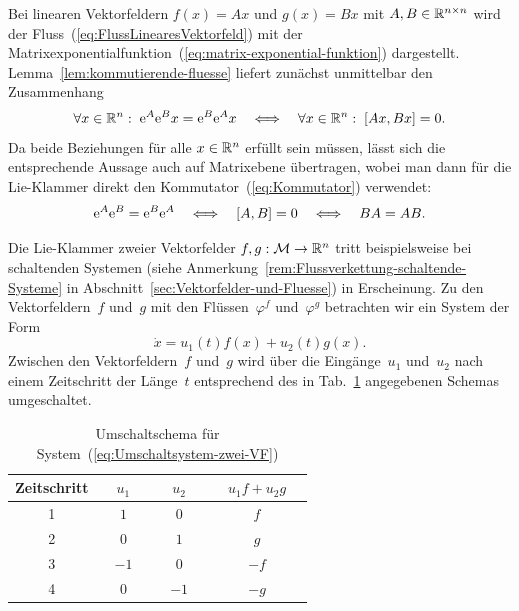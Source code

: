 \begin{example}
\label{ex:Kommutierende-lineare-Systeme}Bei linearen Vektorfeldern
$f(x)=Ax$ und $g(x)=Bx$ mit $A,B\in{\mathbb{R}}^{n\times n}$ wird der Fluss~(\ref{eq:FlussLinearesVektorfeld})
mit der Matrixexponentialfunktion~(\ref{eq:matrix-exponential-funktion})
dargestellt. Lemma~\ref{lem:kommutierende-fluesse} liefert zunächst
unmittelbar den Zusammenhang 
\[
\forall x\in{\mathbb{R}}^{n}:\;{\mathrm{e}}^{A}{\mathrm{e}}^{B}x={\mathrm{e}}^{B}{\mathrm{e}}^{A}x\quad\Longleftrightarrow\quad\forall x\in{\mathbb{R}}^{n}:\;[Ax,Bx]=0.
\]
Da beide Beziehungen für alle $x\in{\mathbb{R}}^{n}$ erfüllt sein müssen, lässt
sich die entsprechende Aussage auch auf Matrixebene übertragen, wobei
man dann für die Lie-Klammer direkt den Kommutator~(\ref{eq:Kommutator})
verwendet: 
\[
{\mathrm{e}}^{A}{\mathrm{e}}^{B}={\mathrm{e}}^{B}{\mathrm{e}}^{A}\quad\Longleftrightarrow\quad[A,B]=0\quad\Longleftrightarrow\quad BA=AB.
\]
\end{example}
\medskip{}

Die Lie-Klammer zweier Vektorfelder $f,g:\mathcal{M}\to{\mathbb{R}}^{n}$ tritt
beispielsweise bei schaltenden Systemen (siehe Anmerkung~\ref{rem:Flussverkettung-schaltende-Systeme}
in Abschnitt~\ref{sec:Vektorfelder-und-Fluesse}) in Erscheinung.
Zu den Vektorfeldern~$f$ und~$g$ mit den Flüssen~$\varphi^{f}$
und~$\varphi^{g}$ betrachten wir ein System der Form 
\begin{equation}
\dot{x}=u_{1}(t)f(x)+u_{2}(t)g(x).\label{eq:Umschaltsystem-zwei-VF}
\end{equation}
Zwischen den Vektorfeldern~$f$ und~$g$ wird über die Eingänge~$u_{1}$
und~$u_{2}$ nach einem Zeitschritt der Länge~$t$ entsprechend
des in Tab.~\ref{tab:Umschaltschema} angegebenen Schemas umgeschaltet.

\begin{table}
\caption{Umschaltschema für System~(\ref{eq:Umschaltsystem-zwei-VF})\label{tab:Umschaltschema}}

\noindent \centering{}%
\begin{tabular}{cccc}
\hline 
Zeitschritt & $\quad u_{1}\quad$ & $\quad u_{2}\quad$ & $\quad u_{1}f+u_{2}g\quad$\tabularnewline
\hline 
1 & $1$ & $0$ & $f$\tabularnewline
2 & $0$ & $1$ & $g$\tabularnewline
3 & $-1$ & $0$ & $-f$\tabularnewline
4 & $0$ & $-1$ & $-g$\tabularnewline
\hline 
\end{tabular}
\end{table}

